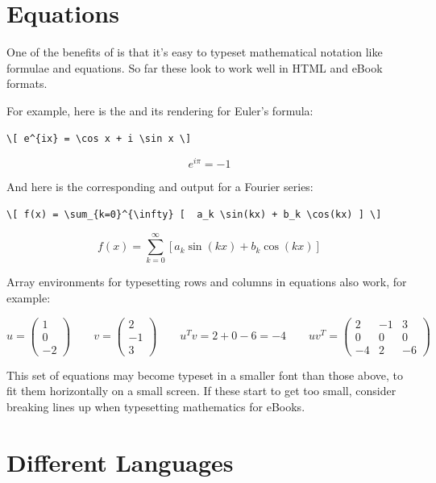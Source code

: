 \section{Equations}

One of the benefits of \latex is that it's easy to typeset mathematical notation like formulae and equations. So far these look to work well in HTML and eBook formats.

For example, here is the \tex and its rendering for Euler's formula:

\begin{Verbatim}[fontsize=\scriptsize]
\[ e^{ix} = \cos x + i \sin x \]
\end{Verbatim}
\[ e^{i\pi} = -1 \]

And here is the corresponding \tex and output for a Fourier series:

\begin{Verbatim}[fontsize=\scriptsize]
\[ f(x) = \sum_{k=0}^{\infty} [  a_k \sin(kx) + b_k \cos(kx) ] \]
\end{Verbatim}
\[ f(x) = \sum_{k=0}^{\infty} [  a_k \sin(kx) + b_k \cos(kx) ] \]

Array environments for typesetting rows and columns in equations also work, for example:

\[
u = \left( \begin{array}{c} 1 \\ 0 \\ -2 \end{array} \right) \qquad
v = \left( \begin{array}{c} 2 \\ -1 \\ 3 \end{array} \right) \qquad
u^T v = 2 + 0 - 6 = -4 \qquad
u v^T = \left( \begin{array}{ccc} 2 & -1 & 3 \\ 0 & 0 & 0 \\ -4 & 2 & -6 \end{array} \right)
\]

This set of equations may become typeset in a smaller font than those above, to fit them
horizontally on a small screen. If these start to get too small, consider breaking lines up
when typesetting mathematics for eBooks.

\section{Different Languages}

